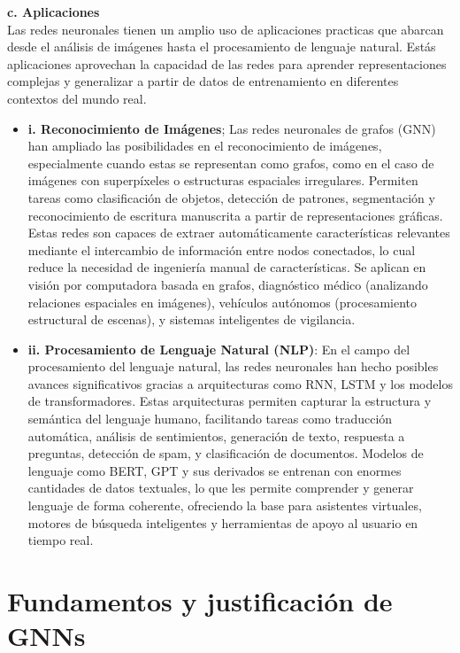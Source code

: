 \documentclass[11pt]{article} %
\begin{document}
\textbf{c. Aplicaciones} \\[3pt]
Las redes neuronales tienen un amplio uso de aplicaciones practicas que abarcan desde el análisis de imágenes hasta el procesamiento de lenguaje natural. Estás aplicaciones aprovechan la capacidad de las redes para aprender representaciones complejas y generalizar a partir de datos de entrenamiento en diferentes contextos del mundo real.
\begin{itemize}
\item \textbf{i. Reconocimiento de Imágenes}; \newline
Las redes neuronales de grafos (GNN) han ampliado las posibilidades en el reconocimiento de imágenes, especialmente cuando estas se representan como grafos, como en el caso de imágenes con superpíxeles o estructuras espaciales irregulares. Permiten tareas como clasificación de objetos, detección de patrones, segmentación y reconocimiento de escritura manuscrita a partir de representaciones gráficas. Estas redes son capaces de extraer automáticamente características relevantes mediante el intercambio de información entre nodos conectados, lo cual reduce la necesidad de ingeniería manual de características. Se aplican en visión por computadora basada en grafos, diagnóstico médico (analizando relaciones espaciales en imágenes), vehículos autónomos (procesamiento estructural de escenas), y sistemas inteligentes de vigilancia.


    \item \textbf{ii. Procesamiento de Lenguaje Natural (NLP)}: \newline
    En el campo del procesamiento del lenguaje natural, las redes neuronales han hecho posibles avances significativos gracias a arquitecturas como RNN, LSTM y los modelos de transformadores. Estas arquitecturas permiten capturar la estructura y semántica del lenguaje humano, facilitando tareas como traducción automática, análisis de sentimientos, generación de texto, respuesta a preguntas, detección de spam, y clasificación de documentos. Modelos de lenguaje como BERT, GPT y sus derivados se entrenan con enormes cantidades de datos textuales, lo que les permite comprender y generar lenguaje de forma coherente, ofreciendo la base para asistentes virtuales, motores de búsqueda inteligentes y herramientas de apoyo al usuario en tiempo real.

\end{itemize}
\newpage
{\section{Fundamentos y justificación de GNNs}} 
\end{document}
